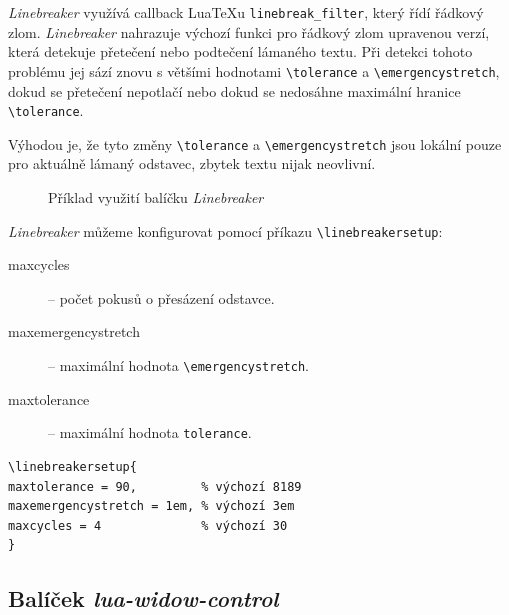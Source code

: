 \documentclass{csbulletin}
\newcommand\balicek[1]{\textit{#1}}
\begin{document}
\balicek{Linebreaker} využívá callback Lua\TeX u \verb|linebreak_filter|, který řídí řádkový zlom.
\balicek{Linebreaker} nahrazuje výchozí funkci pro řádkový zlom upravenou
verzí, která detekuje přetečení nebo podtečení lámaného textu. Při detekci
tohoto problému jej sází znovu s většími hodnotami \verb|\tolerance| a
\verb|\emergencystretch|, dokud se přetečení nepotlačí nebo dokud se nedosáhne
maximální hranice \verb|\tolerance|.

Výhodou je, že tyto změny \verb|\tolerance| a \verb|\emergencystretch| jsou lokální pouze 
pro aktuálně lámaný odstavec, zbytek textu nijak neovlivní. 


\begin{figure}
  \caption{Příklad využití balíčku \balicek{Linebreaker}}
  \label{fig:linebreaker}
\end{figure}


\balicek{Linebreaker} můžeme konfigurovat pomocí příkazu \verb|\linebreakersetup|:
  \begin{description}
    \item[maxcycles] – počet pokusů o přesázení odstavce.
    \item[maxemergencystretch] – maximální hodnota \verb|\emergencystretch|.
    \item[maxtolerance] – maximální hodnota \verb|tolerance|.
  \end{description}

\begin{verbatim}
\linebreakersetup{
maxtolerance = 90,         % výchozí 8189
maxemergencystretch = 1em, % výchozí 3em
maxcycles = 4              % výchozí 30
}
\end{verbatim}

\subsection{Balíček \balicek{lua-widow-control}}
\end{document}
